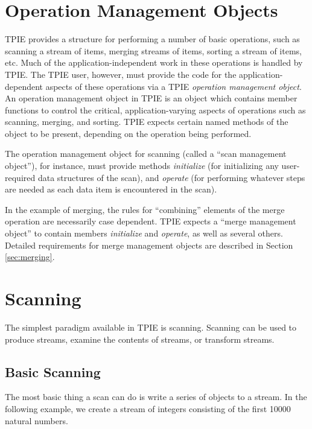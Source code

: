 \section{Operation Management Objects}
\label{sec:omos}

TPIE provides a structure for performing a number of basic
operations, such as scanning a stream of items, merging
streams of items, sorting a stream of items, etc. Much of
the application-independent work in these operations is
handled by TPIE. The TPIE user, however, must provide the
code for the application-dependent aspects of these
operations via a TPIE {\em operation management object}. An
operation management object in TPIE is an object which
contains member functions to control the critical,
application-varying aspects of operations such as scanning,
merging, and sorting. TPIE expects certain named methods of
the object to be present, depending on the operation being
performed. 

The operation management object for scanning (called a
``scan management object''), for instance, must provide methods {\em
   initialize} (for initializing any user-required data
structures of the scan), and {\em operate} (for performing
whatever steps are needed as each data item is encountered
in the scan).

In the example of merging, the rules for ``combining''
elements of the merge operation are necessarily case
dependent. TPIE expects a ``merge management
object'' to contain
members {\em initialize} and {\em operate}, as well as
several others. Detailed requirements for merge management
objects are described in Section \ref{sec:merging}.

\section{Scanning}
\label{sec:scanning}

 
The simplest paradigm available in TPIE is scanning.  Scanning can be
used to produce streams, examine the contents of streams, or transform
streams.  

\subsection{Basic Scanning}

The most basic thing a scan can do is write a series of
objects to a stream.  In the following example, we create a
stream of integers consisting of the first 10000 natural
numbers.  

